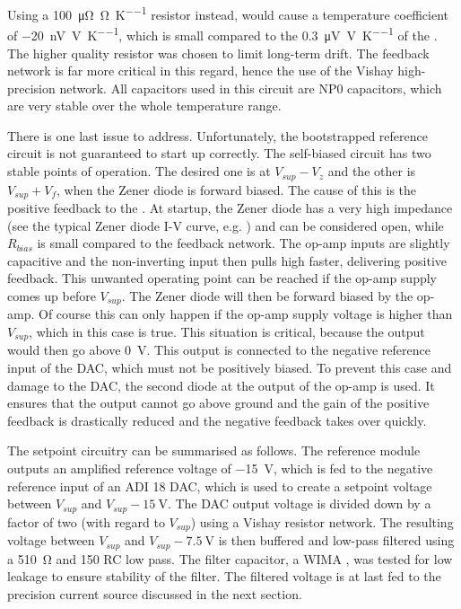 Using a \qty{100}{\micro\ohm \per \ohm \per \K} resistor instead, would cause a temperature coefficient of \qty{-20}{\nV \per \V \per \K}, which is small compared to the \qty{0.3}{\uV \per \V \per \K} of the . The higher quality resistor was chosen to limit long-term drift. The feedback network is far more critical in this regard, hence the use of the Vishay  high-precision network. All capacitors used in this circuit are NP0 capacitors, which are very stable over the whole temperature range.

There is one last issue to address. Unfortunately, the bootstrapped reference circuit is not guaranteed to start up correctly. The self-biased circuit has two stable points of operation. The desired one is at $V_{sup} - V_z$ and the other is $V_{sup} + V_f$, when the Zener diode is forward biased. The cause of this is the positive feedback to the . At startup, the Zener diode has a very high impedance (see the typical Zener diode I-V curve, e.g. \cite{fet_equations}) and can be considered open, while $R_{bias}$ is small compared to the feedback network. The op-amp inputs are slightly capacitive and the non-inverting input then pulls high faster, delivering positive feedback. This unwanted operating point can be reached if the op-amp supply comes up before $V_{sup}$. The Zener diode will then be forward biased by the op-amp. Of course this can only happen if the op-amp supply voltage is higher than $V_{sup}$, which in this case is true. This situation is critical, because the output would then go above \qty{0}{\V}. This output is connected to the negative reference input of the DAC, which must not be positively biased. To prevent this case and damage to the DAC, the second diode at the output of the op-amp is used. It ensures that the output cannot go above ground and the gain of the positive feedback is drastically reduced and the negative feedback takes over quickly.

The setpoint circuitry can be summarised as follows. The reference module outputs an amplified reference voltage of \qty{-15}{\V}, which is fed to the negative reference input of an ADI  \qty{18}{\bit} DAC, which is used to create a setpoint voltage between $V_{sup}$ and  $V_{sup} - \qty{15}{\V}$. The DAC output voltage is divided down by a factor of two (with regard to $V_{sup}$) using a Vishay  resistor network. The resulting voltage between $V_{sup}$ and  $V_{sup} - \qty{7.5}{\V}$ is then buffered and low-pass filtered using a \qty{510}{\ohm} and \qty{150}{\uF} RC low pass. The filter capacitor, a WIMA , was tested for low leakage to ensure stability of the filter. The filtered voltage is at last fed to the precision current source discussed in the next section.

